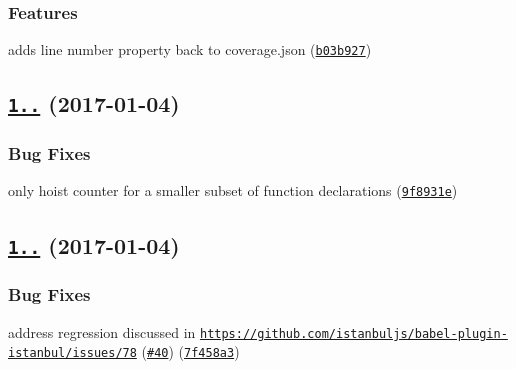 \subsubsection*{Features}


\begin{DoxyItemize}
\item adds line number property back to coverage.\+json (\href{https://github.com/istanbuljs/istanbul-lib-instrument/commit/b03b927}{\tt b03b927})
\end{DoxyItemize}

\label{_1.4.2}%
 \subsection*{\href{https://github.com/istanbuljs/istanbul-lib-instrument/compare/v1.4.1...v1.4.2}{\tt 1..} (2017-\/01-\/04)}

\subsubsection*{Bug Fixes}


\begin{DoxyItemize}
\item only hoist counter for a smaller subset of function declarations (\href{https://github.com/istanbuljs/istanbul-lib-instrument/commit/9f8931e}{\tt 9f8931e})
\end{DoxyItemize}

\label{_1.4.1}%
 \subsection*{\href{https://github.com/istanbuljs/istanbul-lib-instrument/compare/v1.4.0...v1.4.1}{\tt 1..} (2017-\/01-\/04)}

\subsubsection*{Bug Fixes}


\begin{DoxyItemize}
\item address regression discussed in \href{https://github.com/istanbuljs/babel-plugin-istanbul/issues/78}{\tt https\+://github.\+com/istanbuljs/babel-\/plugin-\/istanbul/issues/78} (\href{https://github.com/istanbuljs/istanbul-lib-instrument/issues/40}{\tt \#40}) (\href{https://github.com/istanbuljs/istanbul-lib-instrument/commit/7f458a3}{\tt 7f458a3})
\end{DoxyItemize}

